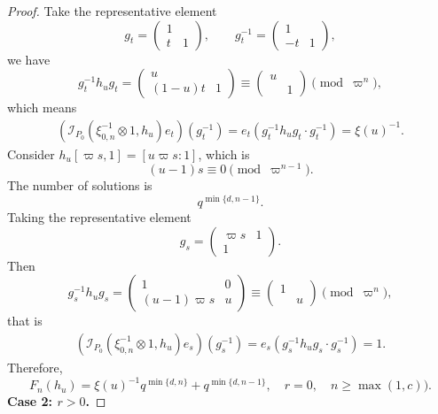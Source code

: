 \documentclass[11pt]{amsart}
\theoremstyle{definition}
\numberwithin{equation}{section}
\begin{document}
\begin{proof}
		
		Take the representative element
		\[
		g_t = \begin{pmatrix} 1 &  \\ t & 1 \end{pmatrix}, \qquad g_t^{-1} = \begin{pmatrix} 1 &  \\ -t & 1 \end{pmatrix},
		\]we have 
		\[g_t^{-1}h_ug_t=\left(\begin{matrix}
			u&\\
			(1-u)t&1
		\end{matrix}\right)\equiv\left(\begin{matrix}
			u&\\
			&1
		\end{matrix}\right)\pmod{\varpi^n},\]which means
		\begin{align*}
			(\mathscr{I}_{P_0}(\xi^{-1}_{0,n}\otimes1,h_u)e_{t})(g_t^{-1})=e_t(g^{-1}_th_ug_t\cdot g_t^{-1})=\xi(u)^{-1}.
		\end{align*}
		Consider \(h_u[\varpi s, 1] =[u\varpi s : 1]\), which is 
		\[(u-1)s\equiv0 \pmod{\varpi^{n-1}}.\]
		The number of solutions is
		\[
		q^{\min\{d,n-1\}}.
		\]
		Taking the representative element
		\[
		g_s = \begin{pmatrix} \varpi s & 1 \\ 1 &  \end{pmatrix}.
		\]
		Then
		\[
		g_s^{-1} h_u g_s = \begin{pmatrix} 1 & 0 \\ (u-1)\varpi s & u \end{pmatrix}\equiv\left(\begin{matrix}
			1&\\
			&u
		\end{matrix}\right)\pmod{\varpi^{n}},
		\]that is 
		\begin{align*}
			(\mathscr{I}_{P_0}(\xi^{-1}_{0,n}\otimes1,h_u)e_{s})(g^{-1}_s)=e_s(g^{-1}_sh_ug_s\cdot g_s^{-1})=1.
		\end{align*}
		Therefore, \[F_n(h_u) =\xi(u)^{-1} q^{\min\{d,n\}} + q^{\min\{d,n-1\}}, \quad r = 0, \quad n \ge \max(1,c)).\]
		\textbf{Case 2: $r>0$.}
		

\end{proof}
\end{document}
